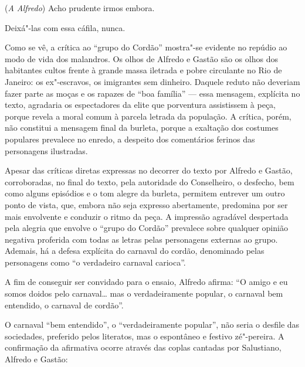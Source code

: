 \begin{hedraquote} 
 (\textit{A Alfredo}) Acho prudente irmos embora.

 Deixá"-las com essa cáfila, nunca.
\end{hedraquote} 

Como se vê, a crítica ao “grupo do Cordão” mostra"-se evidente no repúdio
ao modo de vida dos malandros. Os olhos de Alfredo e Gastão são os
olhos dos habitantes cultos frente à grande massa iletrada e pobre
circulante no Rio de Janeiro: os ex"-escravos, os imigrantes sem
dinheiro. Daquele reduto não deveriam fazer parte as moças e os rapazes
de “boa família” --- essa mensagem, explícita no texto, agradaria os
espectadores da elite que porventura assistissem à peça, porque revela
a moral comum à parcela letrada da população. A crítica, porém, não
constitui a mensagem final da burleta, porque a exaltação dos costumes
populares prevalece no enredo, a despeito dos comentários ferinos das
personagens ilustradas.

Apesar das críticas diretas expressas no decorrer do texto por
Alfredo e Gastão, corroboradas, no final do texto, pela autoridade do
Conselheiro, o desfecho, bem como alguns episódios e o tom alegre da
burleta, permitem entrever um outro ponto de vista, que, embora não
seja expresso abertamente, predomina por ser mais envolvente e conduzir
o ritmo da peça. A impressão agradável despertada pela alegria que
envolve o “grupo do Cordão” prevalece sobre qualquer opinião negativa
proferida com todas as letras pelas personagens externas ao grupo.
Ademais, há a defesa explícita do carnaval do cordão, denominado pelas
personagens como “o verdadeiro carnaval carioca”.

A fim de conseguir ser convidado para o ensaio, Alfredo afirma:
``O amigo e eu somos doidos pelo carnaval\ldots{} mas o verdadeiramente
popular, o carnaval bem entendido, o carnaval de cordão''.

O carnaval “bem entendido”, o “verdadeiramente popular”, não seria o
desfile das sociedades, preferido pelos literatos, mas o espontâneo e
festivo zé"-pereira. A confirmação da afirmativa ocorre através das
coplas cantadas por Salustiano, Alfredo e Gastão:

\pagebreak

